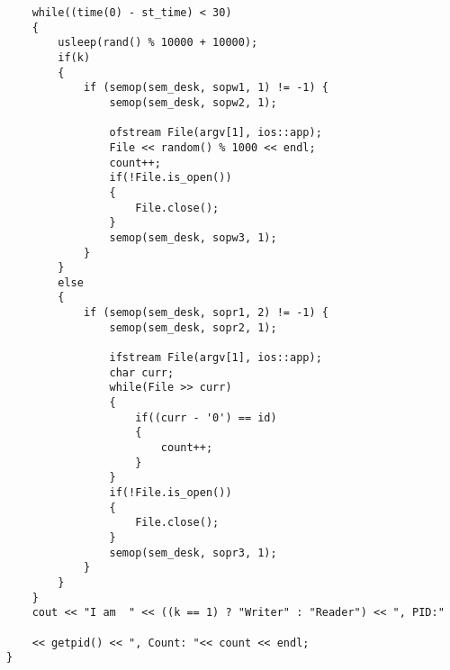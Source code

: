 \documentclass[a4paper,12pt]{extarticle}
\begin{document}
\begin{verbatim}
    while((time(0) - st_time) < 30)
    {
        usleep(rand() % 10000 + 10000);
        if(k)
        {
            if (semop(sem_desk, sopw1, 1) != -1) {
                semop(sem_desk, sopw2, 1);

                ofstream File(argv[1], ios::app);
                File << random() % 1000 << endl;
                count++;
                if(!File.is_open())
                {
                    File.close();
                }
                semop(sem_desk, sopw3, 1);
            }
        }
        else
        {
            if (semop(sem_desk, sopr1, 2) != -1) {
                semop(sem_desk, sopr2, 1);

                ifstream File(argv[1], ios::app);
                char curr;
                while(File >> curr)
                {
                    if((curr - '0') == id)
                    {
                        count++;
                    }
                }
                if(!File.is_open())
                {
                    File.close();
                }
                semop(sem_desk, sopr3, 1);
            }
        }
    }
    cout << "I am  " << ((k == 1) ? "Writer" : "Reader") << ", PID:"
    
    << getpid() << ", Count: "<< count << endl;
}
\end{verbatim}
\hrulefill
\end{document}
